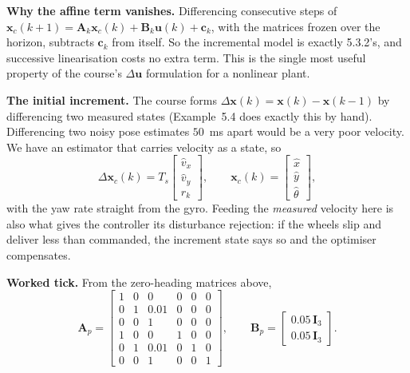 \documentclass[11pt,a4paper]{article}
\newcommand{\vect}[1]{\bm{#1}}
\newcommand{\mat}[1]{\bm{#1}}
\newcommand{\Ts}{T_s}
\begin{document}
\textbf{Why the affine term vanishes.} Differencing consecutive steps of $\vect x_c(k+1) = \mat A_k\vect x_c(k) + \mat B_k\vect u(k) + \vect c_k$, with the matrices frozen over the horizon, subtracts $\vect c_k$ from itself. So the incremental model is exactly 5.3.2's, and successive linearisation costs no extra term. This is the single most useful property of the course's $\Delta\vect u$ formulation for a nonlinear plant.

\textbf{The initial increment.} The course forms $\Delta\vect x(k) = \vect x(k) - \vect x(k-1)$ by differencing two measured states (Example~5.4 does exactly this by hand). Differencing two noisy pose estimates $50$~ms apart would be a very poor velocity. We have an estimator that carries velocity as a state, so
\begin{equation}
\Delta\vect x_c(k) = \Ts\begin{bmatrix}\hat v_x\\ \hat v_y\\ r_k\end{bmatrix},\qquad \vect x_c(k) = \begin{bmatrix}\hat x\\ \hat y\\ \hat\theta\end{bmatrix},
\end{equation}
with the yaw rate straight from the gyro. Feeding the \emph{measured} velocity here is also what gives the controller its disturbance rejection: if the wheels slip and deliver less than commanded, the increment state says so and the optimiser compensates.

\textbf{Worked tick.} From the zero-heading matrices above,
\begin{equation}
\mat A_p = \left[\begin{array}{ccc|ccc}
1 & 0 & 0 & 0 & 0 & 0\\ 0 & 1 & 0.01 & 0 & 0 & 0\\ 0 & 0 & 1 & 0 & 0 & 0\\ \hline
1 & 0 & 0 & 1 & 0 & 0\\ 0 & 1 & 0.01 & 0 & 1 & 0\\ 0 & 0 & 1 & 0 & 0 & 1\end{array}\right],\qquad
\mat B_p = \begin{bmatrix}0.05\,\mat I_3\\ 0.05\,\mat I_3\end{bmatrix}.
\end{equation}
\end{document}
